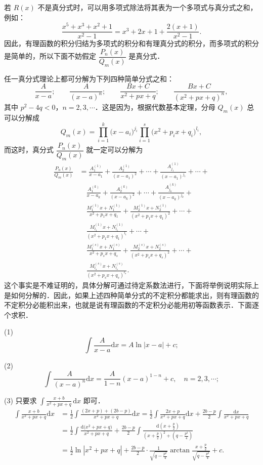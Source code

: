 若 $R(x)$ 不是真分式时，可以用多项式除法将其表为一个多项式与真分式之和，例如：
\[
\frac{x^{5}+x^{3}+x^{2}+1}{x^{2}-1} = x^{3}+2x+1+\frac{2(x+1)}{x^{2}-1}.
\]
因此，有理函数的积分归结为多项式的积分和有理真分式的积分，而多项式的积分是简单的，所以下面不妨假定 $\dfrac{P_{n}(x)}{Q_{m}(x)}$ 是真分式．

任一真分式理论上都可分解为下列四种简单分式之和：
\[
\frac{A}{x-a};\qquad \frac{A}{(x-a)^{n}};\qquad \frac{Bx+C}{x^{2}+px+q};\qquad \frac{Bx+C}{\left(x^{2}+px+q\right)^{n}},
\]
其中 $p^{2}-4q < 0$，$n = 2,3,\cdots$．这是因为，根据代数基本定理，分母 $Q_{m}(x)$ 总可以分解成
\[
Q_{m}(x) = \prod_{i=1}^{k}\big(x-a_{i}\big)^{j_{i}}\prod_{i=1}^{s}\big(x^{2}+p_{i}x+q_{i}\big)^{l_{i}},
\]
而这时，真分式 $\dfrac{P_{n}(x)}{Q_{m}(x)}$ 就一定可以分解为
\[
\begin{aligned}
\frac{P_{n}(x)}{Q_{m}(x)}
&= \frac{A_{1}^{(1)}}{x-a_{1}}+\frac{A_{2}^{(1)}}{\left(x-a_{1}\right)^{2}}+\cdots+\frac{A_{j_{1}}^{(1)}}{\left(x-a_{1}\right)^{j_{1}}}+\cdots+\\
&\quad \frac{A_{1}^{(k)}}{x-a_{k}}+\frac{A_{2}^{(k)}}{\left(x-a_{k}\right)^{2}}+\cdots+\frac{A_{j_{k}}^{(k)}}{\left(x-a_{k}\right)^{j_{k}}}+\\
&\quad \frac{M_{1}^{(1)}x+N_{1}^{(1)}}{x^{2}+p_{1}x+q_{1}}+\frac{M_{2}^{(1)}x+N_{2}^{(1)}}{\left(x^{2}+p_{1}x+q_{1}\right)^{2}}+\cdots+\\
&\quad \frac{M_{l_{1}}^{(1)}x+N_{l_{1}}^{(1)}}{\left(x^{2}+p_{1}x+q_{1}\right)^{l_{1}}}+\cdots+\\
&\quad \frac{M_{1}^{(s)}x+N_{1}^{(s)}}{x^{2}+p_{s}x+q_{s}}+\frac{M_{2}^{(s)}x+N_{2}^{(s)}}{\left(x^{2}+p_{s}x+q_{s}\right)^{2}}+\cdots+\\
&\quad \frac{M_{l_{s}}^{(s)}x+N_{l_{s}}^{(s)}}{\left(x^{2}+p_{s}x+q_{s}\right)^{l_{s}}}.
\end{aligned}
\]
这个事实是不难证明的，具体分解可通过待定系数法进行，下面将举例说明实际上是如何分解的．因此，如果上述四种简单分式的不定积分都能求出，则有理函数的不定积分必能积出来，也就是说有理函数的不定积分必能用初等函数表示．下面逐个求积．

(1)
\[
\int\frac{A}{x-a}\mathrm{d}x = A\ln|x-a|+c;
\]

(2)
\[
\int\frac{A}{(x-a)^{n}}\mathrm{d}x = \frac{A}{1-n}(x-a)^{1-n}+c,\quad n = 2,3,\cdots;
\]

(3) 只要求 $\displaystyle\int\frac{x+b}{x^{2}+px+q}\,\mathrm{d}x$ 即可．
\[
\begin{aligned}
\int\frac{x+b}{x^{2}+px+q}\mathrm{d}x
&= \frac{1}{2}\int\frac{(2x+p)+(2b-p)}{x^{2}+px+q}\mathrm{d}x
= \frac{1}{2}\int\frac{2x+p}{x^{2}+px+q}\mathrm{d}x+\frac{2b-p}{2}\int\frac{\mathrm{d}x}{x^{2}+px+q}\\
&= \frac{1}{2}\int\frac{\mathrm{d}\big(x^{2}+px+q\big)}{x^{2}+px+q}
+\frac{2b-p}{2}\int\frac{\mathrm{d}\left(x+\frac{p}{2}\right)}{\left(x+\frac{p}{2}\right)^{2}+\left(q-\frac{p^{2}}{4}\right)}\\
&= \frac{1}{2}\ln\left|x^{2}+px+q\right|
+\frac{2b-p}{2}\cdot\frac{1}{\sqrt{q-\frac{p^{2}}{4}}}\arctan\frac{x+\frac{p}{2}}{\sqrt{q-\frac{p^{2}}{4}}}+c.
\end{aligned}
\]

